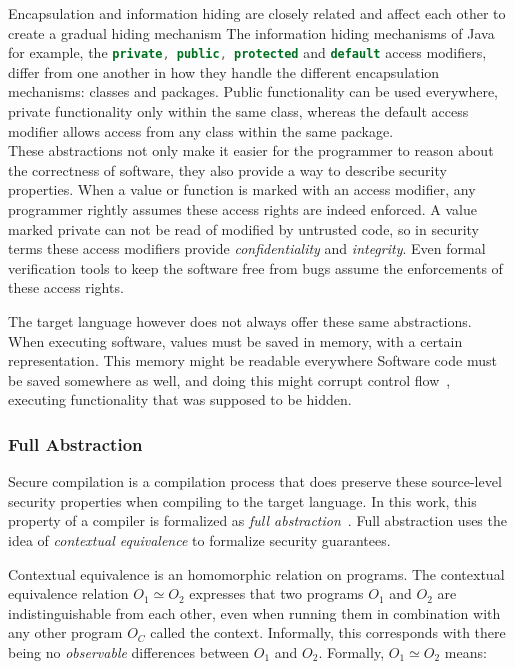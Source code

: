 Encapsulation and information hiding are closely related and affect each other to create a gradual hiding mechanism
The information hiding mechanisms of Java for example, the \lstinline[language=Java]{private, public, protected} and \lstinline[language=Java]{default} access modifiers, differ from one another in how they handle the different encapsulation mechanisms: classes and packages.
Public functionality can be used everywhere, private functionality only within the same class, whereas the default access modifier allows access from any class within the same package.
\\[1em]
These abstractions not only make it easier for the programmer to reason about the correctness of software, they also provide a way to describe security properties.
When a value or function is marked with an access modifier, any programmer rightly assumes these access rights are indeed enforced.
A value marked private can not be read of modified by untrusted code, so in security terms these access modifiers provide \emph{confidentiality} and \emph{integrity}.
Even formal verification tools to keep the software free from bugs assume the enforcements of these access rights.

The target language however does not always offer these same abstractions.
When executing software, values must be saved in memory, with a certain representation.
This memory might be readable everywhere
Software code must be saved somewhere as well, and doing this might corrupt control flow~\cite{OVSPaper}, executing functionality that was supposed to be hidden.

\subsubsection{Full Abstraction}
\label{sec:fullabstraction}
Secure compilation is a compilation process that does preserve these source-level security properties when compiling to the target language.
In this work, this property of a compiler is formalized as \emph{full abstraction}~\cite{Abadi}.
Full abstraction uses the idea of \emph{contextual equivalence} to formalize security guarantees.

Contextual equivalence is an homomorphic relation on programs.
The contextual equivalence relation $O_{1} \simeq O_{2}$ expresses that two programs $O_1$ and $O_2$ are indistinguishable from each other, even when running them in combination with any other program $O_C$ called the context.
Informally, this corresponds with there being no \emph{observable} differences between $O_1$ and $O_2$.
Formally, $O_{1} \simeq O_{2}$ means:

